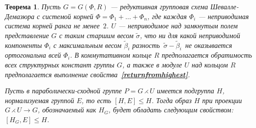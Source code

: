 \documentclass[12pt]{matmex-diploma}
\theoremstyle{mystyleni}
\theoremstyle{mystyle}
\newtheorem{thm}{Теорема}
\newcommand\refb[1]{\textbf{\ref{#1}}}
\renewcommand{\le}{\leqslant}
\begin{document}
\begin{thm}\label{subgroupprojectionmain}
  Пусть $G = G(\Phi, R)$ --- редуктивная групповая схема Шевалле-Демазюра
  с системой корней $\Phi = \Phi_1 + \ldots + \Phi_n$, где каждая $\Phi_i$ --- неприводимая система корней ранга не менее~$2$. $U$ --- неприводимое над замкнутым полем представление $G$ с таким старшим весом $\widetilde\sigma$, что ни для какой неприводимой компоненты $\Phi_i$ с максимальным весом $\widetilde\beta_i$ разность~${\widetilde\sigma-\widetilde\beta_i}$~не оказывается ортогональна всей $\Phi_i$. В коммутативном кольце $R$ предполагается обратимость всех структурных констант группы $G$, а также в модуле $U$ над кольцом $R$ предполагается выполнение свойства~\refb{returnfromhighest}.
    
  Пусть в параболически-сходной группе $P=G\rightthreetimes U$ имеется подгруппа $H$, нормализуемая группой $E$, то есть $[H,E] \le H$. Тогда образ $H$ при проекции $G \rightthreetimes U \rightarrow G$, обозначаемый как $H_G$, будет обладать следующим свойством: $[H_G,E]\le H$.
\end{thm}
\end{document}
